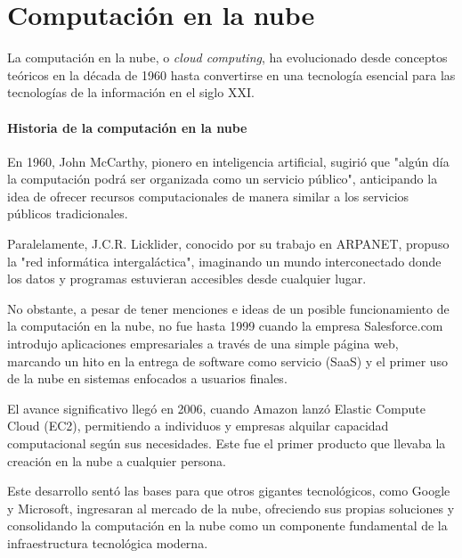 \documentclass[12pt,twoside,titlepage]{report}
\begin{document}
\section{Computación en la nube}

La computación en la nube, o \textit{cloud computing}, ha evolucionado desde conceptos teóricos en la década de 1960 hasta convertirse en una tecnología esencial para las tecnologías de la información en el siglo XXI. 
\paragraph{Historia de la computación en la nube\cite{history_cloud_computing}\\}
En 1960, John McCarthy, pionero en inteligencia artificial, sugirió que "algún día la computación podrá ser organizada como un servicio público", anticipando la idea de ofrecer recursos computacionales de manera similar a los servicios públicos tradicionales. 

Paralelamente, J.C.R. Licklider, conocido por su trabajo en ARPANET, propuso la "red informática intergaláctica", imaginando un mundo interconectado donde los datos y programas estuvieran accesibles desde cualquier lugar. 

No obstante, a pesar de tener menciones e ideas de un posible funcionamiento de la computación en la nube, no fue hasta 1999 cuando la empresa Salesforce.com introdujo aplicaciones empresariales a través de una simple página web, marcando un hito en la entrega de software como servicio (SaaS) y el primer uso de la nube en sistemas enfocados a usuarios finales.

El avance significativo llegó en 2006, cuando Amazon lanzó Elastic Compute Cloud (EC2), permitiendo a individuos y empresas alquilar capacidad computacional según sus necesidades. Este fue el primer producto que llevaba la creación en la nube a cualquier persona.

Este desarrollo sentó las bases para que otros gigantes tecnológicos, como Google y Microsoft, ingresaran al mercado de la nube, ofreciendo sus propias soluciones y consolidando la computación en la nube como un componente fundamental de la infraestructura tecnológica moderna.
\end{document}

